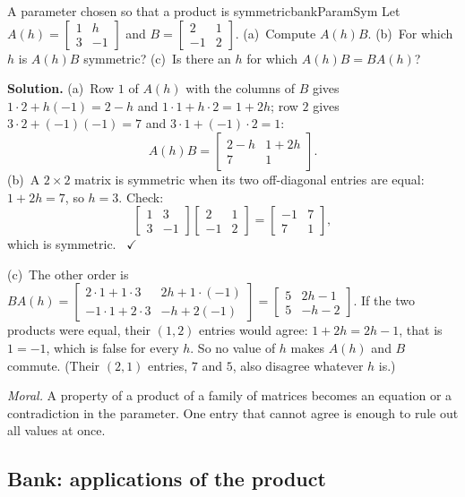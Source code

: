 \documentclass[11pt]{article}
\begin{document}
\begin{exmp}{A parameter chosen so that a product is symmetric}{bankParamSym}
Let $A(h)=\begin{bmatrix}1&h\\3&-1\end{bmatrix}$ and $B=\begin{bmatrix}2&1\\-1&2\end{bmatrix}$. (a)~Compute $A(h)B$. (b)~For which $h$ is $A(h)B$ symmetric? (c)~Is there an $h$ for which $A(h)B=BA(h)$?

\textbf{Solution.} (a)~Row $1$ of $A(h)$ with the columns of $B$ gives $1\cdot2+h(-1)=2-h$ and $1\cdot1+h\cdot2=1+2h$; row $2$ gives $3\cdot2+(-1)(-1)=7$ and $3\cdot1+(-1)\cdot2=1$:
\[
A(h)B=\begin{bmatrix}2-h&1+2h\\7&1\end{bmatrix}.
\]
(b)~A $2\times2$ matrix is symmetric when its two off-diagonal entries are equal: $1+2h=7$, so $h=3$. Check:
\[
\begin{bmatrix}1&3\\3&-1\end{bmatrix}\begin{bmatrix}2&1\\-1&2\end{bmatrix}=\begin{bmatrix}-1&7\\7&1\end{bmatrix},
\]
which is symmetric. \ $\checkmark$

(c)~The other order is $BA(h)=\begin{bmatrix}2\cdot1+1\cdot3&2h+1\cdot(-1)\\-1\cdot1+2\cdot3&-h+2(-1)\end{bmatrix}=\begin{bmatrix}5&2h-1\\5&-h-2\end{bmatrix}$. If the two products were equal, their $(1,2)$ entries would agree: $1+2h=2h-1$, that is $1=-1$, which is false for every $h$. So no value of $h$ makes $A(h)$ and $B$ commute. (Their $(2,1)$ entries, $7$ and $5$, also disagree whatever $h$ is.)

\emph{Moral.} A property of a product of a family of matrices becomes an equation or a contradiction in the parameter. One entry that cannot agree is enough to rule out all values at once.
\end{exmp}

\subsection*{Bank: applications of the product}
\end{document}
